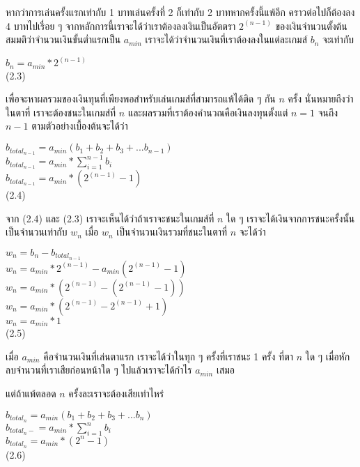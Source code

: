 \documentclass{article}
\begin{document}
หากว่าการเล่นครั้งแรกเท่ากับ 1 บาทเล่นครั้งที่ 2 ก็เท่ากับ 2 บาทหากครั้งนี้แพ้อีก คราวต่อไปก็ต้องลง 4 บาทไปเรื่อย ๆ จากหลักการนี้เราจะได้ว่าเราต้องลงเงินเป็นอัตตรา $2^{(n-1)}$ ของเงินจำนวนตั้งต้น สมมติว่าจำนวนเงินขั้นต่ำแรกเป็น $a_{min}$ เราจะได้ว่าจำนวนเงินที่เราต้องลงในแต่ละเกมส์ $b_n$ จะเท่ากับ\\
\begin{center}
$b_n=a_{min}*2^{(n-1)}$\\
(2.3)
\end{center}
เพื่อจะหาผลรวมของเงินทุนที่เพียงพอสำหรับเล่นเกมส์ที่สามารถแพ้ได้ติด ๆ กัน $n$ ครั้ง นั่นหมายถึงว่าในตาที่ เราจะต้องชนะในเกมส์ที่ $n$ และผลรวมที่เราต้องคำนวณคือเงินลงทุนตั้งแต่ $n=1$ จนถึง $n-1$ ตามตัวอย่างเบื้องต้นจะได้ว่า
\begin{center}
$b_{total_{n-1}}=a_{min}(b_1+b_2+b_3+...b_{n-1})$\\
$b_{total_{n-1}} = a_{min} * \sum^{n-1}_{i=1}b_i$\\
$b_{total_{n-1}} = a_{min} * (2^{(n-1)}-1)$\\
(2.4)
\end{center}
จาก (2.4) และ (2.3) เราจะเห็นได้ว่าถ้าเราจะชนะในเกมส์ที่ $n$ ใด ๆ เราจะได้เงินจากการชนะครั้งนั้นเป็นจำนวนเท่ากับ $w_n$ เมื่อ $w_n$ เป็นจำนวนเงินรวมที่ชนะในตาที่ $n$ จะได้ว่า
\begin{center}
$w_n=b_n - b_{total_{n-1}}$\\
$w_n=a_{min}*2^{(n-1)} - a_{min}(2^{(n-1)}-1)$\\
$w_n=a_{min}*(2^{(n-1)}-(2^{(n-1)}-1))$\\
$w_n=a_{min}*(2^{(n-1)}-2^{(n-1)}+1)$\\
$w_n=a_{min}*1$\\
(2.5)
\end{center}
เมื่อ $a_{min}$ คือจำนวนเงินที่เล่นตาแรก เราจะได้ว่าในทุก ๆ ครั้งที่เราชนะ 1 ครั้ง ที่ตา $n$ ใด ๆ เมื่อหักลบจำนวนที่เราเสียก่อนหน้าใด ๆ ไปแล้วเราจะได้กำไร $a_{min}$ เสมอ 

แต่ถ้าแพ้ตลอด $n$ ครั้งละเราจะต้องเสียเท่าไหร่
\begin{center}
$b_{total_n}=a_{min}(b_1+b_2+b_3+...b_n)$\\
$b_{total_n-} = a_{min} * \sum^n_{i=1}b_i$\\
$b_{total_n} = a_{min} * (2^n-1)$\\
(2.6)
\end{center}
\end{document}
